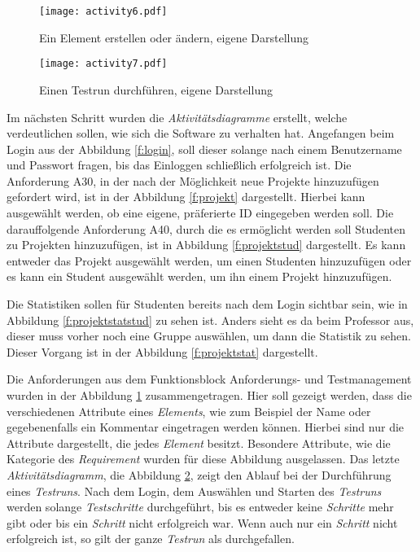 \documentclass[11pt,a4paper]{report}
\begin{document}
\begin{figure}[htpb]
  \centering
  \texttt{[image: activity6.pdf]}
  \caption{Ein Element erstellen oder ändern, eigene Darstellung}
  \label{f:element}
\end{figure}

\begin{figure}[htpb]
  \centering
  \texttt{[image: activity7.pdf]}
  \caption{Einen Testrun durchführen, eigene Darstellung}
  \label{f:testrunact}
\end{figure}

Im nächsten Schritt wurden die \textit{Aktivitätsdiagramme} erstellt, welche verdeutlichen sollen, wie sich die Software zu verhalten hat. Angefangen beim Login aus der Abbildung \ref{f:login}, soll dieser solange nach einem Benutzername und Passwort fragen, bis das Einloggen schließlich erfolgreich ist. Die Anforderung A30, in der nach der Möglichkeit neue Projekte hinzuzufügen gefordert wird, ist in der Abbildung \ref{f:projekt} dargestellt. Hierbei kann ausgewählt werden, ob eine eigene, präferierte ID eingegeben werden soll. Die darauffolgende Anforderung A40, durch die es ermöglicht werden soll Studenten zu Projekten hinzuzufügen, ist in Abbildung \ref{f:projektstud} dargestellt. Es kann entweder das Projekt ausgewählt werden, um einen Studenten hinzuzufügen oder es kann ein Student ausgewählt werden, um ihn einem Projekt hinzuzufügen.

Die Statistiken sollen für Studenten bereits nach dem Login sichtbar sein, wie in Abbildung \ref{f:projektstatstud} zu sehen ist. Anders sieht es da beim Professor aus, dieser muss vorher noch eine Gruppe auswählen, um dann die Statistik zu sehen. Dieser Vorgang ist in der Abbildung \ref{f:projektstat} dargestellt.


Die Anforderungen aus dem Funktionsblock Anforderungs- und Testmanagement wurden in der Abbildung \ref{f:element} zusammengetragen. Hier soll gezeigt werden, dass die verschiedenen Attribute eines \textit{Elements}, wie zum Beispiel der Name oder gegebenenfalls ein Kommentar eingetragen werden können. Hierbei sind nur die Attribute dargestellt, die jedes \textit{Element} besitzt. Besondere Attribute, wie die Kategorie des \textit{Requirement} wurden für diese Abbildung ausgelassen. Das letzte \textit{Aktivitätsdiagramm}, die Abbildung \ref{f:testrunact}, zeigt den Ablauf bei der Durchführung eines \textit{Testruns}. Nach dem Login, dem Auswählen und Starten des \textit{Testruns} werden solange \textit{Testschritte} durchgeführt, bis es entweder keine \textit{Schritte} mehr gibt oder bis ein \textit{Schritt} nicht erfolgreich war. Wenn auch nur ein \textit{Schritt} nicht erfolgreich ist, so gilt der ganze \textit{Testrun} als durchgefallen.
\end{document}
